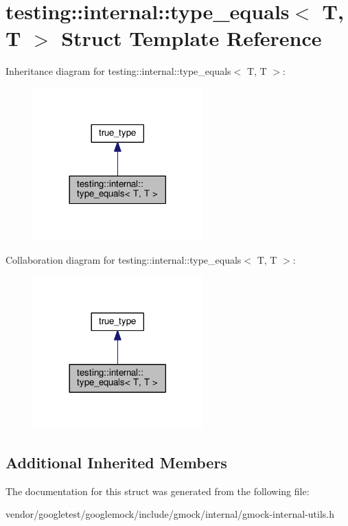 \hypertarget{structtesting_1_1internal_1_1type__equals_3_01T_00_01T_01_4}{}\section{testing\+:\+:internal\+:\+:type\+\_\+equals$<$ T, T $>$ Struct Template Reference}
\label{structtesting_1_1internal_1_1type__equals_3_01T_00_01T_01_4}


Inheritance diagram for testing\+:\+:internal\+:\+:type\+\_\+equals$<$ T, T $>$\+:\nopagebreak
\begin{figure}[H]
\begin{center}
\leavevmode
\includegraphics[width=185pt]{structtesting_1_1internal_1_1type__equals_3_01T_00_01T_01_4__inherit__graph}
\end{center}
\end{figure}


Collaboration diagram for testing\+:\+:internal\+:\+:type\+\_\+equals$<$ T, T $>$\+:\nopagebreak
\begin{figure}[H]
\begin{center}
\leavevmode
\includegraphics[width=185pt]{structtesting_1_1internal_1_1type__equals_3_01T_00_01T_01_4__coll__graph}
\end{center}
\end{figure}
\subsection*{Additional Inherited Members}


The documentation for this struct was generated from the following file\+:\begin{DoxyCompactItemize}
\item 
vendor/googletest/googlemock/include/gmock/internal/gmock-\/internal-\/utils.\+h\end{DoxyCompactItemize}
